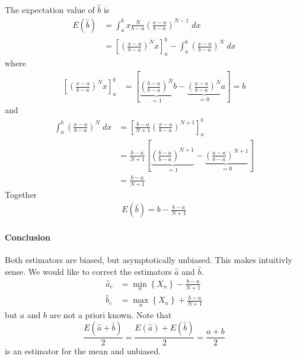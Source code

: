 The expectation value of $\hat{b}$ is
\begin{align}
    E(\hat{b})&=\int_{a}^{b}x\frac{N}{b-a}\left(\frac{x-a}{b-a}\right)^{N-1}\;dx
    \\&=\left[\left(\frac{x-a}{b-a}\right)^N x\right]_a^b-\int_{a}^{b}\left(\frac{x-a}{b-a}\right)^N\;dx
\end{align}
where
\begin{align}
    \left[\left(\frac{x-a}{b-a}\right)^N x\right]_a^b&=\left[\underbrace{\left(\frac{b-a}{b-a}\right)^N}_{=1}b-\underbrace{\left(\frac{a-a}{b-a}\right)^N}_{=0}a\right]=b
\end{align}
and
\begin{align}
    \int_{a}^{b}\left(\frac{x-a}{b-a}\right)^N\;dx&=\left[\frac{b-a}{N+1}\left(\frac{x-a}{b-a}\right)^{N+1}\right]_a^b
    \\&=\frac{b-a}{N+1}\left[\underbrace{\left(\frac{b-a}{b-a}\right)^{N+1}}_{=1}-\underbrace{\left(\frac{a-a}{b-a}\right)^{N+1}}_{=0}\right]
    \\&=\frac{b-a}{N+1}
\end{align}
Together
\begin{align}
    E(\hat{b})=b-\frac{b-a}{N+1}
\end{align}
\paragraph{Conclusion} Both estimators are biased, but asymptotically unbiased. This makes intuitivly sense.
We would like to correct the estimators $\hat{a}$ and $\hat{b}$.
\begin{align}
    \hat{a}_c &= \min_n\left\{X_n\right\}-\frac{b-a}{N+1}
    \\\hat{b}_c &= \max_n\left\{X_n\right\}+\frac{b-a}{N+1}
\end{align}
but $a$ and $b$ are not a priori known.
Note that
\begin{equation}
    \frac{E(\hat{a}+\hat{b})}{2}=\frac{E(\hat{a})+E(\hat{b})}{2}=\frac{a+b}{2}
\end{equation}
is an estimator for the mean and unbiased.